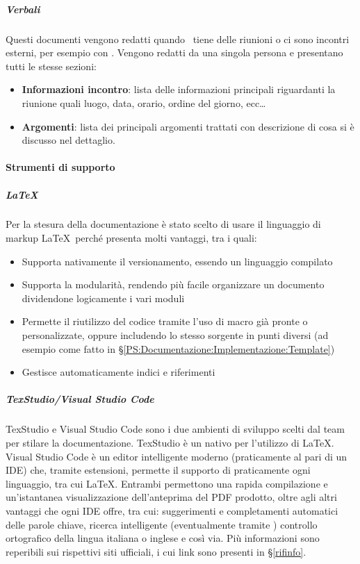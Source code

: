 

			\subparagraph{Verbali}
			Questi documenti vengono redatti quando \gruppo\ tiene delle riunioni o ci sono incontri esterni, per esempio con \II. Vengono redatti da una singola persona
			e presentano tutti le stesse sezioni:
			\begin{itemize}
				\item \textbf{Informazioni incontro}: lista delle informazioni principali riguardanti la riunione quali luogo, data, orario, ordine del giorno, ecc\dots
				\item \textbf{Argomenti}: lista dei principali argomenti trattati con descrizione di cosa si è discusso nel dettaglio.
			\end{itemize}


			\paragraph{Strumenti di supporto}

			\subparagraph{\LaTeX} \label{LaTeX}
			Per la stesura della documentazione è stato scelto di usare il linguaggio di markup \LaTeX \ perché presenta molti vantaggi, tra i quali:
			\begin{itemize}
				\item Supporta nativamente il versionamento, essendo un linguaggio compilato
				\item Supporta la modularità, rendendo più facile organizzare un documento dividendone logicamente i vari moduli
				\item Permette il riutilizzo del codice tramite l'uso di macro già pronte o personalizzate, oppure includendo lo stesso sorgente in punti diversi
					(ad esempio come fatto in \S\ref{PS:Documentazione:Implementazione:Template})
				\item Gestisce automaticamente indici e riferimenti
			\end{itemize}

			\subparagraph{TexStudio/Visual Studio Code}
			TexStudio e Visual Studio Code sono i due ambienti di sviluppo scelti dal team per stilare la documentazione.
			TexStudio è un  nativo per l'utilizzo di \LaTeX. Visual Studio Code è un editor intelligente moderno (praticamente al pari di un IDE) che, tramite
			estensioni, permette il supporto di praticamente ogni linguaggio, tra cui \LaTeX.
			Entrambi permettono una rapida compilazione e un'istantanea visualizzazione dell'anteprima del PDF prodotto, oltre agli altri vantaggi che ogni IDE offre,
			tra cui: suggerimenti e completamenti automatici delle parole chiave, ricerca intelligente (eventualmente tramite ) controllo ortografico della
			lingua italiana o inglese e così via. Più informazioni sono reperibili sui rispettivi siti ufficiali, i cui link sono presenti in \S\ref{rifinfo}.


